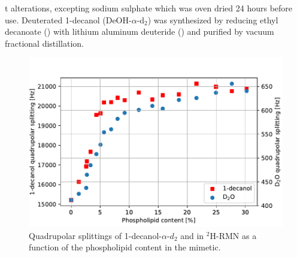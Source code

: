 \documentclass[twoside,twocolumn,9pt]{article}
\begin{document}
t alterations, excepting sodium sulphate which was oven dried 24 hours
before use.
Deuterated 1-decanol (DeOH-$\alpha$-d$_2$) was synthesized by reducing ethyl
decanoate () with lithium aluminum deuteride () and
purified by vacuum fractional distillation.\\

\begin{figure}[h]
\centering
  \includegraphics[width=\columnwidth]{splitting_v_phospholipid}
  \caption{Quadrupolar splittings of 1-decanol-$\alpha$-$d_2$ and  in
    $^2$H-RMN as a function of the phospholipid content in the mimetic.}
  \label{fig:1st_max}
\end{figure}
\end{document}
